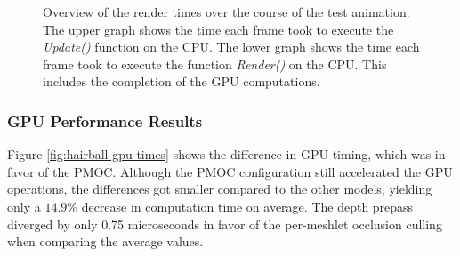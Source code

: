 \begin{figure}[!htb]
\begin{center}
    \caption{Overview of the render times over the course of the test animation. The upper graph shows the time 
    each frame took to execute the \emph{Update()} function on the \ac{CPU}. The lower graph shows the time each 
    frame took to execute the function \emph{Render()} on the \ac{CPU}. This includes the completion of the 
    \ac{GPU} computations.}
    \label{plt:hairball-256-culling-cpu-time}
  \end{center}
\end{figure}

\subsubsection*{GPU Performance Results} \label{subsubsec-gpu-performance-results-hairball}

Figure \ref{fig:hairball-gpu-times} shows the difference in \ac{GPU} timing, which was in favor of the 
\ac{PMOC}. Although the \ac{PMOC} configuration still accelerated the \ac{GPU} 
operations, the differences got smaller compared to the other models, yielding only a $14.9\%$ decrease in 
computation time on average. The depth prepass diverged by only 0.75 microseconds in favor of the per-meshlet 
occlusion culling when comparing the average values.  

